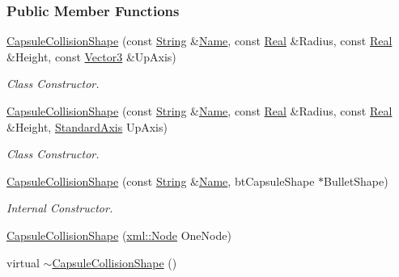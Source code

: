 \subsubsection*{Public Member Functions}
\begin{DoxyCompactItemize}
\item 
\hyperlink{classMezzanine_1_1CapsuleCollisionShape_a8709e48065ef7698506c9854d41afe8e}{CapsuleCollisionShape} (const \hyperlink{namespaceMezzanine_acf9fcc130e6ebf08e3d8491aebcf1c86}{String} \&\hyperlink{classMezzanine_1_1CollisionShape_aac524c5c56fa4d158bc071f8aecfbe79}{Name}, const \hyperlink{namespaceMezzanine_a726731b1a7df72bf3583e4a97282c6f6}{Real} \&Radius, const \hyperlink{namespaceMezzanine_a726731b1a7df72bf3583e4a97282c6f6}{Real} \&Height, const \hyperlink{classMezzanine_1_1Vector3}{Vector3} \&UpAxis)
\begin{DoxyCompactList}\small\item\em Class Constructor. \item\end{DoxyCompactList}\item 
\hyperlink{classMezzanine_1_1CapsuleCollisionShape_abe6eb6dffc5f40d424974b4f0801cf28}{CapsuleCollisionShape} (const \hyperlink{namespaceMezzanine_acf9fcc130e6ebf08e3d8491aebcf1c86}{String} \&\hyperlink{classMezzanine_1_1CollisionShape_aac524c5c56fa4d158bc071f8aecfbe79}{Name}, const \hyperlink{namespaceMezzanine_a726731b1a7df72bf3583e4a97282c6f6}{Real} \&Radius, const \hyperlink{namespaceMezzanine_a726731b1a7df72bf3583e4a97282c6f6}{Real} \&Height, \hyperlink{namespaceMezzanine_ab41a00a8c6a47b576dc987ec34e16ba1}{StandardAxis} UpAxis)
\begin{DoxyCompactList}\small\item\em Class Constructor. \item\end{DoxyCompactList}\item 
\hyperlink{classMezzanine_1_1CapsuleCollisionShape_a5391a125678d98b509abc8f60cb475be}{CapsuleCollisionShape} (const \hyperlink{namespaceMezzanine_acf9fcc130e6ebf08e3d8491aebcf1c86}{String} \&\hyperlink{classMezzanine_1_1CollisionShape_aac524c5c56fa4d158bc071f8aecfbe79}{Name}, btCapsuleShape $\ast$BulletShape)
\begin{DoxyCompactList}\small\item\em Internal Constructor. \item\end{DoxyCompactList}\item 
\hyperlink{classMezzanine_1_1CapsuleCollisionShape_a1182d5388b18969541ea6a2556e446aa}{CapsuleCollisionShape} (\hyperlink{classMezzanine_1_1xml_1_1Node}{xml::Node} OneNode)
\item 
\hypertarget{classMezzanine_1_1CapsuleCollisionShape_a197e7425d126ff8b6e7f6da27e0d978c}{
virtual \hyperlink{classMezzanine_1_1CapsuleCollisionShape_a197e7425d126ff8b6e7f6da27e0d978c}{$\sim$CapsuleCollisionShape} ()}
\label{classMezzanine_1_1CapsuleCollisionShape_a197e7425d126ff8b6e7f6da27e0d978c}


\end{DoxyCompactItemize}
